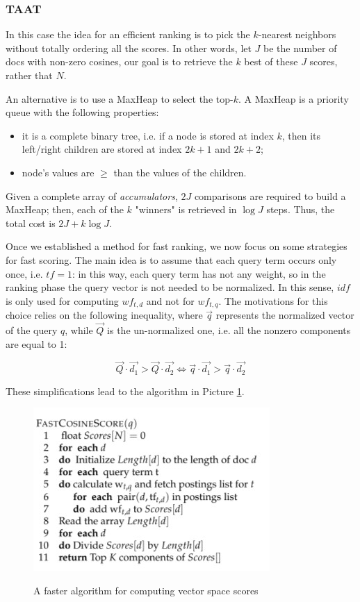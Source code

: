 \subsubsection{TAAT}
In this case the idea for an efficient ranking is to pick the $k$-nearest neighbors without totally ordering all the scores. In other words, let $J$ be the number of docs with non-zero cosines, our goal is to retrieve the $k$ best of these $J$ scores, rather that $N$.

An alternative is to use a MaxHeap to select the top-$k$. A MaxHeap is a priority queue with the following properties:

\begin{itemize}
    \item it is a complete binary tree, i.e. if a node is stored at index $k$, then its left/right children are stored at index $2k + 1$ and $2k + 2$;
    \item node's values are $\geq$ than the values of the children.
\end{itemize}

Given a complete array of \textit{accumulators}, $2J$ comparisons are required to build a MaxHeap; then, each of the $k$ "winners" is retrieved in $\log J$ steps. Thus, the total cost is $2J + k\log J$.

Once we established a method for fast ranking, we now focus on some strategies for fast scoring. The main idea is to assume that each query term occurs only once, i.e. $tf = 1$: in this way, each query term has not any weight, so in the ranking phase the query vector is not needed to be normalized. In this sense, $idf$ is only used for computing $wf_{t,d}$ and not for $wf_{t,q}$. The motivations for this choice relies on the following inequality, where $\Vec{q}$ represents the normalized vector of the query $q$, while $\Vec{Q}$ is the un-normalized one, i.e. all the nonzero components are equal to 1:

$$
\Vec{Q} \cdot \Vec{d_1} >  \Vec{Q} \cdot \Vec{d_2} \Longleftrightarrow \Vec{q} \cdot \Vec{d_1} >  \Vec{q} \cdot \Vec{d_2}
$$

These simplifications lead to the algorithm in Picture \ref{fast cosine score}.

\begin{figure}[h!]
		\centering
		\includegraphics[scale = 2.0]{img/fast cosine score.jpg}
		\label{fast cosine score}
        \caption{A faster algorithm for computing vector space scores}
\end{figure}

